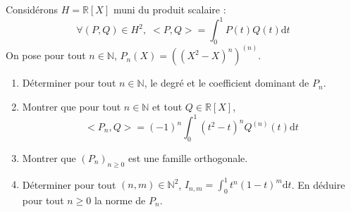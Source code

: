 \documentclass[a4paper,twoside,french,11pt]{VcCours}
\newcommand{\dt}{\text{d}t}
\begin{document}
\begin{Exercice}[$\bigstar$]{} Considérons $H= \mathbb{R}[X]$ muni du produit scalaire :
$$ \forall (P,Q) \in H^2, \; <P,Q> = \int_{0}^1 P(t) Q(t) \dt $$
On pose pour tout $n \in \mathbb{N}$, $P_n(X)= ((X^2-X)^n)^{(n)}$.

\begin{enumerate}
\item Déterminer pour tout $n \in \mathbb{N}$, le degré et le coefficient dominant de $P_n$.
\item Montrer que pour tout $n \in \mathbb{N}$ et tout $Q \in \mathbb{R}[X]$,
$$ <P_n,Q> = (-1)^n \int_{0}^1 (t^2-t)^n Q^{(n)}(t) \dt $$
\item Montrer que $(P_n)_{n \geq 0}$ est une famille orthogonale.
\item Déterminer pour tout $(n,m) \in \mathbb{N}^2$, $I_{n,m} = \int_{0}^1 t^n(1-t)^m \dt$. En déduire pour tout $n \geq 0$ la norme de $P_n$.
\end{enumerate}
\end{Exercice}
\end{document}
